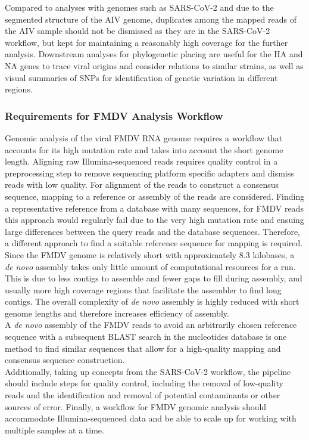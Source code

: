 Compared to analyses with genomes such as \ac{SARS-CoV-2} and due to the segmented structure of the \ac{AIV} genome, duplicates among the mapped reads of the \ac{AIV} sample should not be dismissed as they are in the \ac{SARS-CoV-2} workflow, but kept for maintaining a reasonably high coverage for the further analysis. Downstream analyses for phylogenetic placing are useful for the \ac{HA} and \ac{NA} genes to trace viral origins and consider relations to similar strains, as well as visual summaries of \acp{SNP} for identification of genetic variation in different regions.

\subsubsection{Requirements for FMDV Analysis Workflow}
Genomic analysis of the viral \ac{FMDV} \ac{RNA} genome requires a workflow that accounts for its high mutation rate and takes into account the short genome length. Aligning raw Illumina-sequenced reads requires quality control in a preprocessing step to remove sequencing platform specific adapters and dismiss reads with low quality. For alignment of the reads to construct a consensus sequence, mapping to a reference or assembly of the reads are considered. Finding a representative reference from a database with many sequences, for \ac{FMDV} reads this approach would regularly fail due to the very high mutation rate and ensuing large differences between the query reads and the database sequences. Therefore, a different approach to find a suitable reference sequence for mapping is required. Since the \ac{FMDV} genome is relatively short with approximately 8.3 kilobases, a \textit{de novo} assembly takes only little amount of computational resources for a run. This is due to less contigs to assemble and fewer gaps to fill during assembly, and usually more high coverage regions that facilitate the assembler to find long contigs. The overall complexity of \textit{de novo} assembly is highly reduced with short genome lengths and therefore increases efficiency of assembly.\\
A \textit{de novo} assembly of the \ac{FMDV} reads to avoid an arbitrarily chosen reference sequence with a subsequent \ac{BLAST} search in the nucleotides database is one method to find similar sequences that allow for a high-quality mapping and consensus sequence construction.\\
Additionally, taking up concepts from the \ac{SARS-CoV-2} workflow, the pipeline should include steps for quality control, including the removal of low-quality reads and the identification and removal of potential contaminants or other sources of error. Finally, a workflow for \ac{FMDV} genomic analysis should accommodate Illumina-sequenced data and be able to scale up for working with multiple samples at a time.

